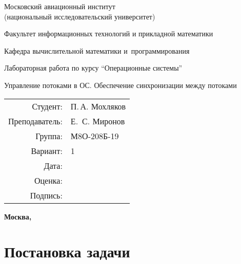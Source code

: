 \documentclass[pdf, unicode, 12pt, a4paper,oneside,fleqn]{article}
\begin{document}
\begin{titlepage}
    \begin{center}
        \bfseries

        {\Large Московский авиационный институт\\ (национальный исследовательский университет)}
        
        \vspace{48pt}
        
        {\large Факультет информационных технологий и прикладной математики}
        
        \vspace{36pt}
        
        {\large Кафедра вычислительной математики и~программирования}
        
        \vspace{48pt}
        
        Лабораторная работа  по курсу \enquote{Операционные системы}

        \vspace{48pt}

        Управление потоками в ОС. Обеспечение синхронизации между потоками
    \end{center}
    
    \vspace{140pt}
    
    \begin{flushright}
    \begin{tabular}{rl}
    Студент: & П.\,А. Мохляков \\
    Преподаватель: & Е. \,С. Миронов \\
    Группа: & М8О-208Б-19 \\
    Вариант: & 1 \\
    Дата: & \\
    Оценка: & \\
    Подпись: & \\
    \end{tabular}
    \end{flushright}
    
    \vfill
    
    \begin{center}
    \bfseries
    Москва, \the\year
    \end{center}
\end{titlepage}
    
\pagebreak

\section{Постановка задачи}
\end{document}

